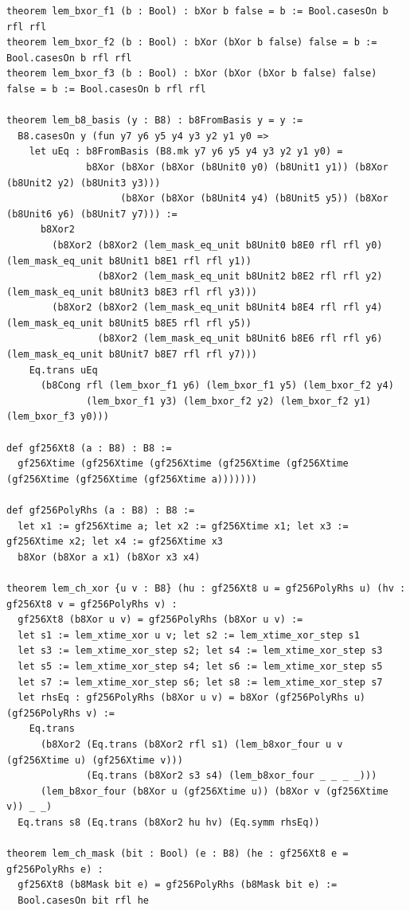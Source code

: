 \documentclass[10pt,twocolumn]{article}
\theoremstyle{spectralthm}
\begin{document}
\begin{lstlisting}[language=Lean4,caption={Standalone Pure Init.Prelude Term-Mode Lean 4 Expansion (thm30--thm37, v1.1.0, 0 sorry, 0 axioms).},label={lst:lean_v110}]
theorem lem_bxor_f1 (b : Bool) : bXor b false = b := Bool.casesOn b rfl rfl
theorem lem_bxor_f2 (b : Bool) : bXor (bXor b false) false = b := Bool.casesOn b rfl rfl
theorem lem_bxor_f3 (b : Bool) : bXor (bXor (bXor b false) false) false = b := Bool.casesOn b rfl rfl

theorem lem_b8_basis (y : B8) : b8FromBasis y = y :=
  B8.casesOn y (fun y7 y6 y5 y4 y3 y2 y1 y0 =>
    let uEq : b8FromBasis (B8.mk y7 y6 y5 y4 y3 y2 y1 y0) =
              b8Xor (b8Xor (b8Xor (b8Unit0 y0) (b8Unit1 y1)) (b8Xor (b8Unit2 y2) (b8Unit3 y3)))
                    (b8Xor (b8Xor (b8Unit4 y4) (b8Unit5 y5)) (b8Xor (b8Unit6 y6) (b8Unit7 y7))) :=
      b8Xor2
        (b8Xor2 (b8Xor2 (lem_mask_eq_unit b8Unit0 b8E0 rfl rfl y0) (lem_mask_eq_unit b8Unit1 b8E1 rfl rfl y1))
                (b8Xor2 (lem_mask_eq_unit b8Unit2 b8E2 rfl rfl y2) (lem_mask_eq_unit b8Unit3 b8E3 rfl rfl y3)))
        (b8Xor2 (b8Xor2 (lem_mask_eq_unit b8Unit4 b8E4 rfl rfl y4) (lem_mask_eq_unit b8Unit5 b8E5 rfl rfl y5))
                (b8Xor2 (lem_mask_eq_unit b8Unit6 b8E6 rfl rfl y6) (lem_mask_eq_unit b8Unit7 b8E7 rfl rfl y7)))
    Eq.trans uEq
      (b8Cong rfl (lem_bxor_f1 y6) (lem_bxor_f1 y5) (lem_bxor_f2 y4)
              (lem_bxor_f1 y3) (lem_bxor_f2 y2) (lem_bxor_f2 y1) (lem_bxor_f3 y0)))

def gf256Xt8 (a : B8) : B8 :=
  gf256Xtime (gf256Xtime (gf256Xtime (gf256Xtime (gf256Xtime (gf256Xtime (gf256Xtime (gf256Xtime a)))))))

def gf256PolyRhs (a : B8) : B8 :=
  let x1 := gf256Xtime a; let x2 := gf256Xtime x1; let x3 := gf256Xtime x2; let x4 := gf256Xtime x3
  b8Xor (b8Xor a x1) (b8Xor x3 x4)

theorem lem_ch_xor {u v : B8} (hu : gf256Xt8 u = gf256PolyRhs u) (hv : gf256Xt8 v = gf256PolyRhs v) :
  gf256Xt8 (b8Xor u v) = gf256PolyRhs (b8Xor u v) :=
  let s1 := lem_xtime_xor u v; let s2 := lem_xtime_xor_step s1
  let s3 := lem_xtime_xor_step s2; let s4 := lem_xtime_xor_step s3
  let s5 := lem_xtime_xor_step s4; let s6 := lem_xtime_xor_step s5
  let s7 := lem_xtime_xor_step s6; let s8 := lem_xtime_xor_step s7
  let rhsEq : gf256PolyRhs (b8Xor u v) = b8Xor (gf256PolyRhs u) (gf256PolyRhs v) :=
    Eq.trans
      (b8Xor2 (Eq.trans (b8Xor2 rfl s1) (lem_b8xor_four u v (gf256Xtime u) (gf256Xtime v)))
              (Eq.trans (b8Xor2 s3 s4) (lem_b8xor_four _ _ _ _)))
      (lem_b8xor_four (b8Xor u (gf256Xtime u)) (b8Xor v (gf256Xtime v)) _ _)
  Eq.trans s8 (Eq.trans (b8Xor2 hu hv) (Eq.symm rhsEq))

theorem lem_ch_mask (bit : Bool) (e : B8) (he : gf256Xt8 e = gf256PolyRhs e) :
  gf256Xt8 (b8Mask bit e) = gf256PolyRhs (b8Mask bit e) :=
  Bool.casesOn bit rfl he


\end{lstlisting}
\end{document}

